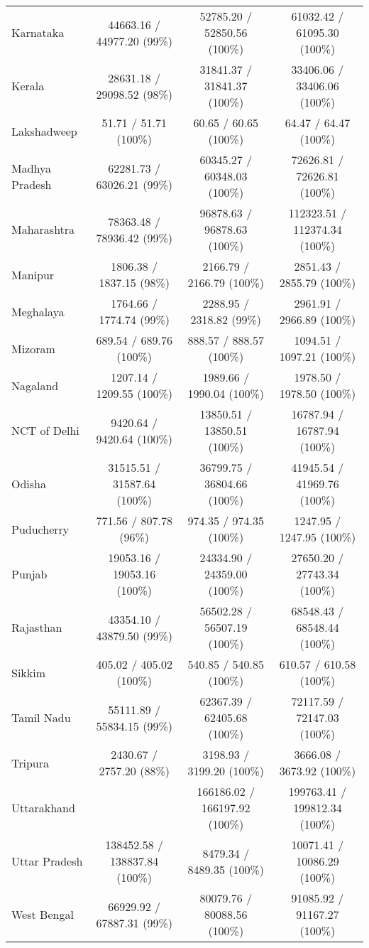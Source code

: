 \begin{center}
{\begin{tabular}{l|c|c|c}
\hline
Karnataka                & 44663.16 / 44977.20 (99\%) & 52785.20 / 52850.56 (100\%) & 61032.42 / 61095.30 (100\%) \\
Kerala                   & 28631.18 / 29098.52 (98\%) & 31841.37 / 31841.37 (100\%) & 33406.06 / 33406.06 (100\%) \\
Lakshadweep              & 51.71 / 51.71 (100\%) & 60.65 / 60.65 (100\%) & 64.47 / 64.47 (100\%) \\
Madhya Pradesh           & 62281.73 / 63026.21 (99\%) & 60345.27 / 60348.03 (100\%) & 72626.81 / 72626.81 (100\%) \\
Maharashtra              & 78363.48 / 78936.42 (99\%) & 96878.63 / 96878.63 (100\%) & 112323.51 / 112374.34 (100\%) \\
\hline
Manipur                  & 1806.38 / 1837.15 (98\%) & 2166.79 / 2166.79 (100\%) & 2851.43 / 2855.79 (100\%) \\
Meghalaya                & 1764.66 / 1774.74 (99\%) & 2288.95 / 2318.82 (99\%) & 2961.91 / 2966.89 (100\%) \\
Mizoram                  & 689.54 / 689.76 (100\%) & 888.57 / 888.57 (100\%) & 1094.51 / 1097.21 (100\%) \\
Nagaland                 & 1207.14 / 1209.55 (100\%) & 1989.66 / 1990.04 (100\%) & 1978.50 / 1978.50 (100\%) \\
NCT of Delhi             & 9420.64 / 9420.64 (100\%) & 13850.51 / 13850.51 (100\%) & 16787.94 / 16787.94 (100\%) \\
\hline
Odisha                   & 31515.51 / 31587.64 (100\%) & 36799.75 / 36804.66 (100\%) & 41945.54 / 41969.76 (100\%) \\
Puducherry               & 771.56 / 807.78 (96\%) & 974.35 / 974.35 (100\%) & 1247.95 / 1247.95 (100\%) \\
Punjab                   & 19053.16 / 19053.16 (100\%) & 24334.90 / 24359.00 (100\%) & 27650.20 / 27743.34 (100\%) \\
Rajasthan                & 43354.10 / 43879.50 (99\%) & 56502.28 / 56507.19 (100\%) & 68548.43 / 68548.44 (100\%) \\
Sikkim                   & 405.02 / 405.02 (100\%) & 540.85 / 540.85 (100\%) & 610.57 / 610.58 (100\%) \\
\hline
Tamil Nadu               & 55111.89 / 55834.15 (99\%) & 62367.39 / 62405.68 (100\%) & 72117.59 / 72147.03 (100\%) \\
Tripura                  & 2430.67 / 2757.20 (88\%) & 3198.93 / 3199.20 (100\%) & 3666.08 / 3673.92 (100\%) \\
Uttarakhand              & & 166186.02 / 166197.92 (100\%) & 199763.41 / 199812.34 (100\%) \\
Uttar Pradesh            & 138452.58 / 138837.84 (100\%) & 8479.34 / 8489.35 (100\%) & 10071.41 / 10086.29 (100\%) \\
West Bengal              & 66929.92 / 67887.31 (99\%) & 80079.76 / 80088.56 (100\%) & 91085.92 / 91167.27 (100\%) \\
\hline


\end{tabular}}
\end{center}
